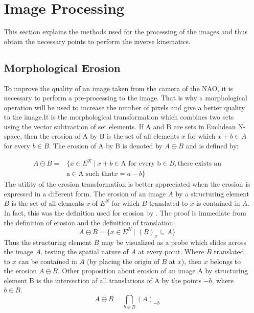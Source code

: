 \documentclass[conference]{IEEEtran}
\begin{document}
\section{Image Processing}
\label{sec:methodology}

This section explains the methods used for the processing of the images and thus obtain the necessary points to perform the inverse kinematics.

\subsection{Morphological Erosion}

To improve the quality of an image taken from the camera of the NAO, it is necessary to perform a pre-processing to the image. That is why a morphological operation will be used to increase the number of pixels and give a better quality to the image.It is the morphological transformation which combines two sets using the vector subtraction of set elements. If A and B are sets in Euclidean N-space, then the erosion of A by B is the set of all elements $x$ for which $x + b \in A$ for every $b \in B$. The erosion of A by B is denoted by $A \ominus B$ and is defined by:

\begin{equation}
\begin{split}
A \ominus B = &\{
x \in E^{N} \mid x + b \in  \textrm{A for every b}  \in B, \textrm{there exists an}\\
& \textrm{a} \in \textrm{A such that} x = a - b\}
\end{split}
\end{equation}
The utility of the erosion transformation is better appreciated when the erosion is expressed in a different form. The erosion of an image $A$ by a structuring element $B$ is the set of all elements $x$ of $E^{N}$ for which $B$ translated to $x$ is contained in $A$. In fact, this was the definition used for erosion by \cite{ref6}. The proof is immediate from the definition of erosion and the definition of translation.
\begin{equation}
A \ominus B =\{x \in E^{N} \mid (B)_{x} \subseteq A \}
\end{equation}
Thus the structuring element $B$ may be visualized as a probe which slides across the image $A$, testing the spatial nature of $A$ at every point. Where $B$ translated to $x$ can be contained in $A$ (by placing the origin of $B$ at $x$), then $x$ belongs to the erosion $A \ominus B$. 
Other proposition about erosion of an image A by structuring element B is the intersection af all translations of A by the points $-b$, where $b \in B$.
\begin{equation}
A \ominus B = \bigcap_{b \in B} (A)_{-b}
\end{equation}
\end{document}

